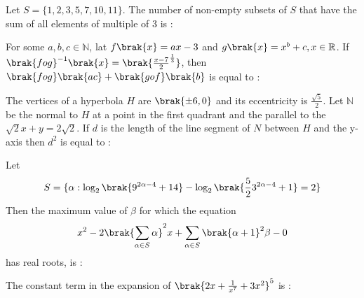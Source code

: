 \iffalse
    \title{2023}
    \author{EE24BTECH11001}
    \section{integer}
\fi
\item Let $S = \{ 1, 2, 3, 5, 7, 10, 11\}$. The number of non-empty subsets of $S$
        that have the sum of all elements of multiple of 3 is :
        \hfill{}\\

    \item For some $a, b, c \in \mathbb{N}$, lat $f\brak{x} = ax - 3$  and 
        $g\brak{x} = x^b + c, x \in \mathbb{R}$. If 
        $\brak{fog}^{-1}\brak{x} = \brak{\frac{x - 7}{2}^{\frac{1}{3}}}$,
        then $\brak{fog}\brak{ac} + \brak{gof}\brak{b}$ is equal to :
        \hfill{}\\



    \item The vertices of a hyperbola $H$ are $\brak{\pm 6, 0}$ and its eccentricity is 
        $\frac{\sqrt{5}}{2}$. Let $\mathbb{N}$ be the normal to $H$ at a point in the first quadrant
        and the parallel to the $\sqrt{2}x + y = 2\sqrt{2}$. If $d$ is the length of the line
        segment of $N$ between $H$ and the y-axis then $d^2$ is equal to :
        \hfill{}\\

    \item Let 
        \begin{align}
            S = \{ \alpha : \log_2 \brak{9^{2\alpha - 4} + 14} - \log_2 \brak{\frac{5}{2}3^{2\alpha - 4} +1} = 2\}
        \end{align} Then the maximum value of $\beta$ for which the equation 
        \begin{align}
            x^2 -2\brak{\sum_{\alpha \in S} \alpha}^2 x + \sum_{\alpha \in S} \brak{\alpha + 1}^2 \beta - 0 
        \end{align} has real roots, is :
        \hfill{}\\


    \item The constant term in the expansion of $\brak{2x + \frac{1}{x^7} + 3x^2}^5$ is : 
        \hfill{}\\


